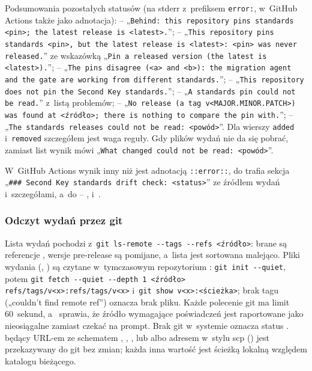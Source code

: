 Podsumowania pozostałych statusów (na stderr z~prefiksem \texttt{error:}, w~GitHub Actions
także jako adnotacja):  -- „\texttt{Behind: this repository pins standards
<pin>; the latest release is <latest>.}”;  -- „\texttt{This repository pins
standards <pin>, but the latest release is <latest>: <pin> was never released.}” ze
wskazówką „\texttt{Pin a released version (the latest is <latest>).}”; 
-- „\texttt{The pins disagree (<a> and <b>): the migration agent and the gate are working
from different standards.}”;  -- „\texttt{This repository does not pin
the Second Key standards.}”;  -- „\texttt{A standards pin could not be
read.}” z~listą problemów;  -- „\texttt{No release (a tag
v<MAJOR.MINOR.PATCH>) was found at <źródło>; there is nothing to compare the pin with.}”;
 -- „\texttt{The standards releases could not be read:
<powód>}”. Dla wierszy \texttt{added} i~\texttt{removed} szczegółem jest waga reguły. Gdy
plików wydań nie da się pobrać, zamiast list wynik mówi „\texttt{What changed could not be
read: <powód>}”.

W~GitHub Actions wynik inny niż  jest adnotacją \texttt{::error::}, do
 trafia sekcja „\texttt{\#\#\# Second Key standards drift
check: <status>}” ze źródłem wydań i~szczegółami, a~do  --
,  i~.

\subsubsection{Odczyt wydań przez git}

Lista wydań pochodzi z~\texttt{git ls-remote -{}-tags -{}-refs <źródło>}: brane są referencje
, wersje pre-release są pomijane, a~lista jest sortowana malejąco.
Pliki wydania (, ) są czytane w~tymczasowym
repozytorium : \texttt{git init -{}-quiet}, potem \texttt{git fetch
-{}-quiet -{}-depth 1 <źródło> refs/tags/v<x>:refs/tags/v<x>} i~\texttt{git show v<x>:<ścieżka>};
brak tagu („couldn't find remote ref”) oznacza brak pliku. Każde polecenie git ma limit
60~sekund, a~ sprawia, że źródło wymagające poświadczeń jest
raportowane jako nieosiągalne zamiast czekać na prompt. Brak git w~systemie oznacza status
.  będący URL-em ze schematem
, , ,  lub  albo
adresem w~stylu scp () jest przekazywany do git bez zmian; każda
inna wartość jest ścieżką lokalną względem katalogu bieżącego.

